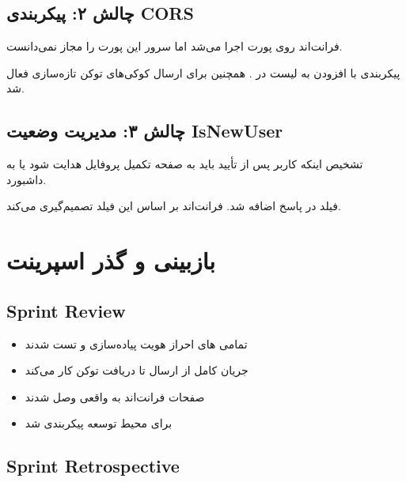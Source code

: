 \documentclass[12pt, a4paper]{article}
\begin{document}
\subsection{چالش ۲: پیکربندی CORS}
\begin{description}[rightmargin=0.5cm]
  \item[مشکل:] فرانت‌اند روی پورت  اجرا می‌شد اما  سرور این پورت را
    مجاز نمی‌دانست.
  \item[راه‌حل:] پیکربندی  با افزودن  به لیست
     در . همچنین  برای
    ارسال کوکی‌های توکن تازه‌سازی فعال شد.
\end{description}

\subsection{چالش ۳: مدیریت وضعیت IsNewUser}
\begin{description}[rightmargin=0.5cm]
  \item[مشکل:] تشخیص اینکه کاربر پس از تأیید  باید به صفحه تکمیل پروفایل هدایت
    شود یا به داشبورد.
  \item[راه‌حل:] فیلد  در پاسخ  اضافه شد.
    فرانت‌اند بر اساس این فیلد تصمیم‌گیری می‌کند.
\end{description}

\newpage

\section{بازبینی و گذر اسپرینت}

\subsection{Sprint Review}
\begin{itemize}[rightmargin=0.5cm]
  \item تمامی های احراز هویت پیاده‌سازی و تست شدند
  \item جریان کامل  از ارسال تا دریافت توکن کار می‌کند
  \item صفحات فرانت‌اند به  واقعی وصل شدند
  \item {} برای محیط توسعه پیکربندی شد
\end{itemize}

\subsection{Sprint Retrospective}
\end{document}
